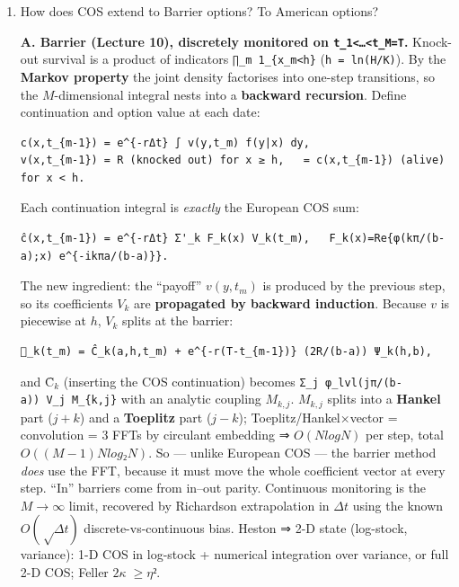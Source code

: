 \documentclass[
  11pt,
]{article}
\begin{document}
\begin{enumerate}
  \textbf{Feller condition:} \(2κ ≥ η²\). It guarantees the CIR
  variance process stays strictly positive (never hits 0), which keeps
  the density well-behaved and \(φ\) clean; if violated, \(v\) can touch
  zero and the simulation/quadrature near \(v=0\) needs care.
\item
  How does COS extend to Barrier options? To American options?

  \textbf{A. Barrier (Lecture 10), discretely monitored on
  \texttt{t\_1\textless{}…\textless{}t\_M=T}.} Knock-out survival is a
  product of indicators \texttt{∏\_m\ 1\_\{x\_m\textless{}h\}}
  (\texttt{h\ =\ ln(H/K)}). By the \textbf{Markov property} the joint
  density factorises into one-step transitions, so the \(M\)-dimensional
  integral nests into a \textbf{backward recursion}. Define continuation
  and option value at each date:

\begin{verbatim}
c(x,t_{m-1}) = e^{-rΔt} ∫ v(y,t_m) f(y|x) dy,
v(x,t_{m-1}) = R (knocked out) for x ≥ h,   = c(x,t_{m-1}) (alive) for x < h.
\end{verbatim}

  Each continuation integral is \emph{exactly} the European COS sum:

\begin{verbatim}
ĉ(x,t_{m-1}) = e^{-rΔt} Σ'_k F_k(x) V_k(t_m),   F_k(x)=Re{φ(kπ/(b-a);x) e^{-ikπa/(b-a)}}.
\end{verbatim}

  The new ingredient: the ``payoff'' \(v(y,t_m)\) is produced by the
  previous step, so its coefficients \(V_k\) are \textbf{propagated by
  backward induction}. Because \(v\) is piecewise at \(h\), \(V_k\)
  splits at the barrier:

\begin{verbatim}
_k(t_m) = Ĉ_k(a,h,t_m) + e^{-r(T-t_{m-1})} (2R/(b-a)) Ψ_k(h,b),
\end{verbatim}

  and \(Ĉ_k\) (inserting the COS continuation) becomes
  \texttt{Σ\_j\ φ\_lvl(jπ/(b-a))\ V\_j\ M\_\{k,j\}} with an analytic
  coupling \(M_{k,j}\). \(M_{k,j}\) splits into a \textbf{Hankel} part
  (\(j+k\)) and a \textbf{Toeplitz} part (\(j−k\));
  Toeplitz/Hankel×vector = convolution = 3 FFTs by circulant embedding ⇒
  \(O(N log N)\) per step, total \(O((M−1)N log₂N)\). So --- unlike
  European COS --- the barrier method \emph{does} use the FFT, because
  it must move the whole coefficient vector at every step. ``In''
  barriers come from in--out parity. Continuous monitoring is the
  \(M→∞\) limit, recovered by Richardson extrapolation in \(Δt\) using
  the known \(O(√Δt)\) discrete-vs-continuous bias. Heston ⇒ 2-D state
  (log-stock, variance): 1-D COS in log-stock + numerical integration
  over variance, or full 2-D COS; Feller \(2κ≥η²\).


\end{enumerate}
\end{document}
